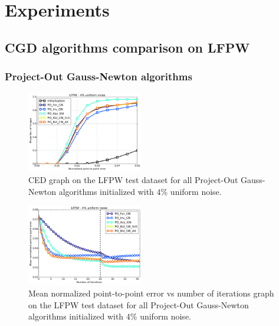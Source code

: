 \section{Experiments}
\label{sec:experiment}


\subsection{CGD algorithms comparison on LFPW}


\subsubsection{Project-Out Gauss-Newton algorithms}

\begin{figure}[h!]
    \centering
    \includegraphics[width=0.45\textwidth]{experiments/algorithms/po_gn/ced_po_gn_4.png}
    \caption{CED graph on the LFPW test dataset for all Project-Out Gauss-Newton algorithms initialized with $4$\% uniform noise.}
    \label{fig:ced_po_gn_4}
\end{figure}

\begin{figure}[h!]
    \centering
    \includegraphics[width=0.45\textwidth]{experiments/algorithms/po_gn/mean_error_vs_iters_po_gn_4.png}
    \caption{Mean normalized point-to-point error vs number of iterations graph on the LFPW test dataset for all Project-Out Gauss-Newton algorithms initialized with $4$\% uniform noise.}
    \label{fig:mean_error_vs_iters_po_gn_4}
\end{figure}

